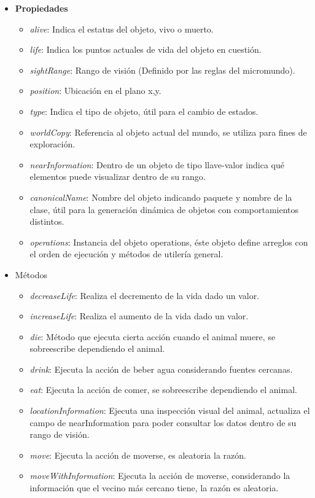     \begin{itemize}
        \item{\textbf{Propiedades}}
          \begin{itemize}
            \item{\textit{alive}: Indica el estatus del objeto, vivo o muerto.}            
            \item{\textit{life}: Indica los puntos actuales de vida del objeto en cuestión.}
            \item{\textit{sightRange}: Rango de visión (Definido por las reglas del micromundo).}
            \item{\textit{position}: Ubicación en el plano x,y.}
            \item{\textit{type}: Indica el tipo de objeto, útil para el cambio de estados.}
            \item{\textit{worldCopy}: Referencia al objeto actual del mundo, se utiliza para fines de exploración.}
            \item{\textit{nearInformation}: Dentro de un objeto de tipo llave-valor indica qué elementos puede visualizar dentro de su rango.}
            \item{\textit{canonicalName}: Nombre del objeto indicando paquete y nombre de la clase, útil para la generación dinámica de objetos con comportamientos distintos.}
            \item{\textit{operations}: Instancia del objeto operations, éste objeto define arreglos con el orden de ejecución y métodos de utilería general.}
          \end{itemize}
        \item{Métodos}
          \begin{itemize}            
            \item{\textit{decreaseLife}: Realiza el decremento de la vida dado un valor.}
            \item{\textit{increaseLife}: Realiza el aumento de la vida dado un valor.}
            \item{\textit{die}: Método que ejecuta cierta acción cuando el animal muere, se sobreescribe dependiendo el animal.}
            \item{\textit{drink}: Ejecuta la acción de beber agua considerando fuentes cercanas.}
            \item{\textit{eat}: Ejecuta la acción de comer, se sobreescribe dependiendo el animal.}
            \item{\textit{locationInformation}: Ejecuta una inspección visual del animal, actualiza el campo de nearInformation para poder consultar los datos dentro de su rango de visión.}
            \item{\textit{move}: Ejecuta la acción de moverse, es aleatoria la razón.}
            \item{\textit{moveWithInformation}: Ejecuta la acción de moverse, considerando la información que el vecino más cercano tiene, la razón es aleatoria.}
          \end{itemize}        
      \end{itemize}
